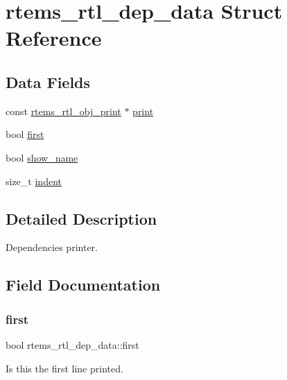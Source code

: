 \hypertarget{structrtems__rtl__dep__data}{}\section{rtems\+\_\+rtl\+\_\+dep\+\_\+data Struct Reference}
\label{structrtems__rtl__dep__data}
\subsection*{Data Fields}
\begin{DoxyCompactItemize}
\item 
const \mbox{\hyperlink{structrtems__rtl__obj__print}{rtems\+\_\+rtl\+\_\+obj\+\_\+print}} $\ast$ \mbox{\hyperlink{structrtems__rtl__dep__data_ad0cbfe0898814b3ea9d1aa435b5a6049}{print}}
\item 
bool \mbox{\hyperlink{structrtems__rtl__dep__data_acde23ac537f2e14a9a8f1c42725e7215}{first}}
\item 
bool \mbox{\hyperlink{structrtems__rtl__dep__data_a20898594eb914745c1799d6a4e02cc19}{show\+\_\+name}}
\item 
size\+\_\+t \mbox{\hyperlink{structrtems__rtl__dep__data_a719b4a485f54cc0a3c71a1eddeb05941}{indent}}
\end{DoxyCompactItemize}


\subsection{Detailed Description}
Dependencies printer. 

\subsection{Field Documentation}
\mbox{\label{structrtems__rtl__dep__data_acde23ac537f2e14a9a8f1c42725e7215}} 
\subsubsection{\texorpdfstring{first}{first}}
{\footnotesize\ttfamily bool rtems\+\_\+rtl\+\_\+dep\+\_\+data\+::first}

Is this the first line printed. \mbox{\label{structrtems__rtl__dep__data_a719b4a485f54cc0a3c71a1eddeb05941}} 
